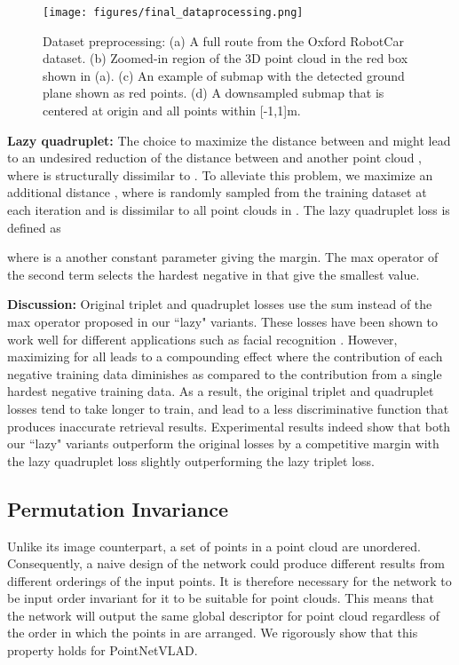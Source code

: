\documentclass[10pt,twocolumn,letterpaper]{article}
\begin{document}
\begin{figure*}[h]
	\begin{center}
		\texttt{[image: figures/final\_dataprocessing.png]}
	\end{center}
	\vspace{-0.3cm}
	\caption{Dataset preprocessing: (a) A full route from the Oxford RobotCar dataset. (b) Zoomed-in region of the 3D point cloud in the red box shown in (a). (c) An example of submap with the detected ground plane shown as red points. (d) A downsampled submap that is centered at origin and all points within [-1,1]m.\vspace{-0.4cm}}
	\label{fig:dataProcessing}
\end{figure*}

\noindent \textbf{Lazy quadruplet:} The choice to maximize the distance between  and  might lead to an undesired reduction of the distance between  and another point cloud , where  is structurally dissimilar to .
To alleviate this problem, we maximize an additional distance , where  is randomly sampled from the training dataset at each iteration and is dissimilar to all point clouds in .
The lazy quadruplet loss is defined as


\noindent where  is a another constant parameter giving the margin. The max operator of the second term selects the hardest negative  in  that give the smallest  value.
\newline


\noindent \textbf{Discussion:} Original triplet and quadruplet losses use the sum instead of the max operator proposed in our ``lazy" variants. These losses have been shown to work well for different applications such as facial recognition \cite{DBLP:journals/corr/SchroffKP15, DBLP:journals/corr/ChenCZH17}. However, maximizing  for all  leads to a compounding effect where the contribution of each negative training data diminishes
as compared to the contribution from a single hardest negative training data. As a result, the original triplet and quadruplet losses tend to take longer to train, and lead to a less discriminative function  that produces inaccurate retrieval results.
Experimental results indeed show that both our ``lazy" variants outperform the original losses by a competitive margin with the lazy quadruplet loss slightly outperforming the lazy triplet loss.


\subsection{Permutation Invariance}
Unlike its image counterpart, a set of points in a point cloud are unordered. Consequently, a naive design of the network could produce different results from different orderings of the input points.  
It is therefore necessary for the network to be input order invariant for it to be suitable for point clouds. This means that the network will output the same global descriptor  for point cloud  regardless of the order in which the points in  are arranged. We rigorously show that this property holds for PointNetVLAD.
\end{document}
